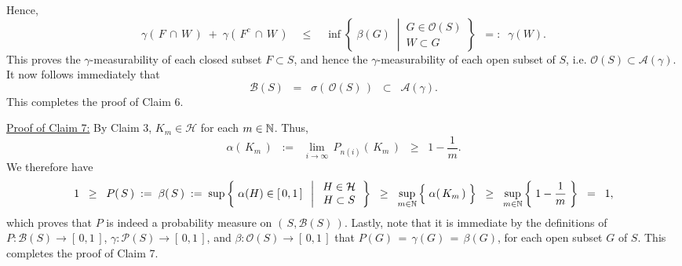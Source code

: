 Hence,
\begin{equation*}
\gamma(\,F\,\cap\,W\,) \;+\; \gamma(\,F^{c}\,\cap\,W\,)
\quad\leq\quad
\inf\left\{\;
\beta(G)
\;\;\left\vert\,
\begin{array}{c} G \in \mathcal{O}(S) \\ W \subset G \end{array}
\right.
\right\}
\;\; =: \;\; \gamma(W).
\end{equation*}
This proves the $\gamma$-measurability of each closed subset $F \subset S$,
and hence the $\gamma$-measurability of each open subset of $S$,
i.e. $\mathcal{O}(S) \subset \mathcal{A}(\gamma)$.
It now follows immediately that
\begin{equation*}
\mathcal{B}(S)
\;\; = \;\; \sigma\!\left(\,\mathcal{O}(S)\,\right)
\;\; \subset \;\; \mathcal{A}(\gamma).
\end{equation*}
This completes the proof of Claim 6.

\vskip 0.5cm
\noindent
\underline{Proof of Claim 7:}\quad
By Claim 3, $K_{m} \in \mathcal{H}$ for each $m \in \mathbb{N}$.
Thus,
\begin{equation*}
\alpha\!\left(\,K_{m}\,\right)
\;\; := \;\; \lim_{i\rightarrow\infty}\,P_{n(i)}\!\left(\,K_{m}\,\right)
\;\;\geq\;\; 1 - \dfrac{1}{m}.
\end{equation*}
We therefore have
\begin{equation*}
1
\;\;\geq\;\; P\!\left(\,S\,\right)
\; := \; \beta\!\left(\,S\,\right)
\; := \;
	\sup\left\{\;
	\alpha(H) \in [\,0,1\,]
	\;\;\left\vert\;
	\begin{array}{c}
	H \in \mathcal{H} \\
	H \subset S
	\end{array}
	\right.
	\right\}
\;\; \geq \;\; \sup_{m\in\N}\left\{\;\overset{{\color{white}-}}{\alpha}\!\left(\,K_{m}\,\right)\;\right\}
\;\; \geq \;\; \sup_{m\in\N}\left\{\;1 - \dfrac{1}{m}\;\right\}
\;\; = \;\; 1,
\end{equation*}
which proves that $P$ is indeed a probability measure on $\left(\,S,\mathcal{B}(S)\,\right)$.
Lastly, note that it is immediate by the definitions of
$P : \mathcal{B}(S) \longrightarrow [\,0,1\,]$,
$\gamma : \mathcal{P}(S) \longrightarrow [\,0,1\,]$, and
$\beta : \mathcal{O}(S) \longrightarrow [\,0,1\,]$
that $P(G) \,=\, \gamma(G) \,=\, \beta(G)$, for each open subset $G$ of $S$.
This completes the proof of Claim 7.

